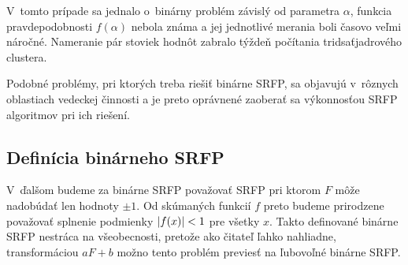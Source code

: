 V~tomto prípade sa jednalo o~binárny problém závislý od parametra $\alpha$,
funkcia pravdepodobnosti $f(\alpha)$ nebola známa a jej jednotlivé merania boli
časovo veľmi náročné. Nameranie pár stoviek hodnôt zabralo týždeň počítania
tridsaťjadrového clustera.

Podobné problémy, pri ktorých treba riešiť binárne SRFP, sa objavujú v~rôznych
oblastiach vedeckej činnosti a je preto oprávnené zaoberať sa výkonnosťou SRFP
algoritmov pri ich riešení. 

\subsection{Definícia binárneho SRFP}
V~ďalšom budeme za binárne SRFP považovať SRFP pri ktorom $F$ môže nadobúdať len
hodnoty $\pm 1$. Od skúmaných funkcií $f$ preto budeme prirodzene považovať
splnenie podmienky $\lvert f(x) \rvert < 1$ pre všetky $x$. Takto definované binárne
SRFP nestráca na všeobecnosti, pretože ako čitateľ ľahko nahliadne,
transformáciou $aF + b$ možno tento problém previesť na ľubovoľné binárne SRFP.
